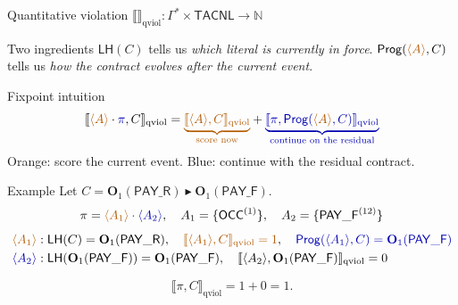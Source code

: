 \documentclass[9pt,aspectratio=169]{beamer}
\newcommand{\logic}[1]{\ensuremath{\mathsf{#1}}\xspace}
\newcommand{\cDL}{\logic{TACNL}}
\newcommand{\Prog}{\ensuremath{\mathsf{Prog}}\xspace}
\newcommand{\repair}{\ensuremath{\blacktriangleright}}
\newcommand{\obl}[2][]{\mathbf{O}_{#1}(#2)}
\newcommand{\trace}[1]{\ensuremath{\langle #1 \rangle}\xspace}
\newcommand{\qsem}[1]{\llbracket #1 \rrbracket_{\text{qviol}}}
\newcommand{\LH}{\ensuremath{\mathsf{LH}}}
\newcommand{\PAY}{\ensuremath{\mathsf{PAY\_R}}\xspace}
\newcommand{\PAYF}{\ensuremath{\mathsf{PAY\_F}}\xspace}
\newcommand{\OCC}{\ensuremath{\mathsf{OCC}}\xspace}
\begin{document}
\begin{frame}{Quantitative violation $\qsem{}:\Gamma^* \times \cDL \to \mathbb{N}$}
\scriptsize
  \begin{block}{Two ingredients}
    $\LH(C)$ tells us \emph{which literal is currently in force}.
    \qquad
    $\Prog(\textcolor{orange!70!black}{\trace{A}},C)$ tells us \emph{how the contract evolves after the current event}.
  \end{block}

  \begin{block}{Fixpoint intuition}
    \[
    \qsem{\textcolor{orange!70!black}{\trace{A}}\cdot \textcolor{blue!70!black}{\pi}, C}
    =
    \textcolor{orange!70!black}{\underbrace{\qsem{\textcolor{orange!70!black}{\trace{A}},C}}_{\text{score now}}}
    +
    \textcolor{blue!70!black}{\underbrace{\qsem{\textcolor{blue!70!black}{\pi},\Prog(\textcolor{orange!70!black}{\trace{A}},C)}}_{\text{continue on the residual}}}
    \]
    \textcolor{orange!70!black}{Orange: score the current event.}
    \qquad
    \textcolor{blue!70!black}{Blue: continue with the residual contract.}
  \end{block}

  \begin{block}{Example}
    Let $C=\obl[1]{\PAY}\repair\obl[1]{\PAYF}$.
    \[
    \pi=\textcolor{orange!70!black}{\trace{A_1}}\cdot \textcolor{blue!70!black}{\trace{A_2}},
    \quad
    A_1=\{\OCC^{(1)}\},
    \quad
    A_2=\{\PAYF^{(12)}\}
    \]
    \[
    \begin{aligned}
    \textcolor{orange!70!black}{\trace{A_1}}:\;&
    \LH(C)=\obl[1]{\PAY},
    \quad
    \textcolor{orange!70!black}{\qsem{\trace{A_1},C}=1},
    \quad
    \textcolor{blue!70!black}{\Prog(\trace{A_1},C)=\obl[1]{\PAYF}}
    \\
    \textcolor{blue!70!black}{\trace{A_2}}:\;&
    \LH(\obl[1]{\PAYF})=\obl[1]{\PAYF},
    \quad
    \qsem{\trace{A_2},\obl[1]{\PAYF}}=0
    \end{aligned}
    \]
  
    \[
    \qsem{\pi,C}=1+0=1.
    \]
  \end{block}
\end{frame}
\end{document}
